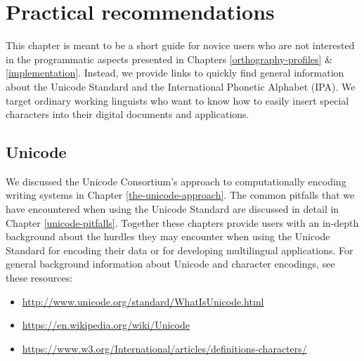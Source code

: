 \chapter{Practical recommendations}
\label{practical-recommendations}


This chapter is meant to be a short guide for novice users who are not interested in the programmatic aspects presented in Chapters \ref{orthography-profiles} \& \ref{implementation}. Instead, we provide links to quickly find general information about the Unicode Standard and the International Phonetic Alphabet (IPA). We target ordinary working linguists who want to know how to easily insert special characters into their digital documents and applications.

\section{Unicode}
We discussed the Unicode Consortium's approach to computationally encoding writing systems in Chapter \ref{the-unicode-approach}. The common pitfalls that we have encountered when using the Unicode Standard are discussed in detail in Chapter \ref{unicode-pitfalls}. Together these chapters provide users with an in-depth background about the hurdles they may encounter when using the Unicode Standard for encoding their data or for developing multilingual applications. For general background information about Unicode and character encodings, see these resources:

\begin{itemize}
	\item \url{http://www.unicode.org/standard/WhatIsUnicode.html}
	\item \url{https://en.wikipedia.org/wiki/Unicode}
	\item \url{https://www.w3.org/International/articles/definitions-characters/}
\end{itemize}

